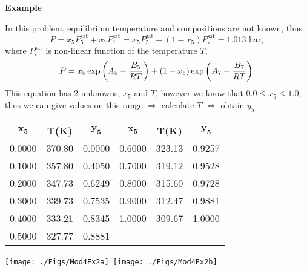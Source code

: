 \begin{MyExample}{\begin{center}{\bf Example}\end{center}}
     In this problem, equilibrium temperature and compositions are not known, thus
          \begin{displaymath}
              P = x_{5}P_{5}^{\text{sat}} + x_{7}P_{7}^{\text{sat}} = x_{5}P_{5}^{\text{sat}} + \left(1 - x_{5}\right)P_{7}^{\text{sat}} = 1.013\text{ bar},
          \end{displaymath}
          where $P_{i}^{\text{sat}}$ is non-linear function of the temperature $T$, \ie
          \begin{displaymath}
              P = x_{5}\exp{\left(A_{5} - \displaystyle\frac{B_{5}}{RT}\right)} + \left(1 - x_{5}\right)\exp{\left(A_{7} - \displaystyle\frac{B_{7}}{RT}\right)}.
          \end{displaymath}
          This equation has 2 unknowns, $x_{5}$ and $T$, however we know that $0.0\leq x_{5} \leq 1.0$, thus we can give values on this range $\Rightarrow$ calculate $T$  $\Rightarrow$  obtain $y_{5}$.
          \begin{center}
              \begin{tabular}{ c c c | c c c}
                  $\mathbf{x_{5}}$ & $\mathbf{T}${\bf(K)}  & $\mathbf{y_{5}}$ & $\mathbf{x_{5}}$ & $\mathbf{T}${\bf(K)}  & $\mathbf{y_{5}}$ \\
                    0.0000          & 370.80                & 0.0000         & 0.6000          & 323.13                & 0.9257          \\
                    0.1000          & 357.80                & 0.4050         & 0.7000          & 319.12                & 0.9528          \\
                    0.2000          & 347.73                & 0.6249         & 0.8000          & 315.60                & 0.9728          \\
                    0.3000          & 339.73                & 0.7535         & 0.9000          & 312.47                & 0.9881          \\
                    0.4000          & 333.21                & 0.8345         & 1.0000          & 309.67                & 1.0000          \\
                    0.5000          & 327.77                & 0.8881         &                 &                       &                 
              \end{tabular}
           \end{center}
           \medskip
             \hbox{\texttt{[image: ./Figs/Mod4Ex2a]}
                   \texttt{[image: ./Figs/Mod4Ex2b]}}
             
   \end{MyExample}

